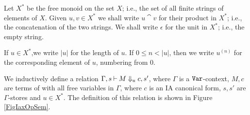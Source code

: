 \begin{definition}
  Let $X^*$ be the free monoid on the set $X$; i.e., the set of all finite strings of elements of $X$.
  Given $u,v\in X^*$ we shall write $u\cat v$ for their product in $X^*$; i.e., the concatenation of the two strings.
  We shall write $\epsilon$ for the unit in $X^*$; i.e., the empty string.

  If $u\in X^*$,we write $|u|$ for the length of $u$.
  If $0\le n < |u|$, then we write $u^{(n)}$ for the corresponding element of $u$, numbering from $0$.

  We inductively define a relation $\Gamma,s\mathbin{\vdash} M\Downarrow_u c,s'$, where $\Gamma$ is a ${\mathtt{Var}}$-context, $M,c$ are terms of \IAX with all free variables in $\Gamma$, where $c$ is an IA canonical form, $s,s'$ are $\Gamma$-stores and $u\in X^*$.
  The definition of this relation is shown in Figure \ref{FigIaxOpSem}.


\end{definition}
